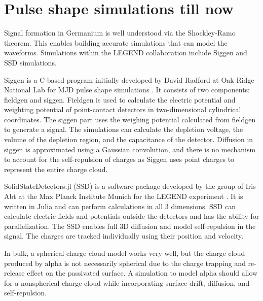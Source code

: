 \section{Pulse shape simulations till now}

Signal formation in Germanium is well understood via the Shockley-Ramo theorem. This enables building accurate simulations that can model the waveforms. Simulations within the LEGEND collaboration include Siggen and SSD simulations. 

Siggen is a C-based program initially developed by David Radford at Oak Ridge National Lab for MJD pulse shape simulations \cite{siggen_paper}. It consists of two components: fieldgen and siggen. Fieldgen is used to calculate the electric potential and weighting potential of point-contact detectors in two-dimensional cylindrical coordinates. The siggen part uses the weighing potential calculated from fieldgen to generate a signal. The simulations can calculate the depletion voltage, the volume of the depletion region, and the capacitance of the detector. Diffusion in siggen is approximated using a Gaussian convolution, and there is no mechanism to account for the self-repulsion of charges as Siggen uses point charges to represent the entire charge cloud.



SolidStateDetectors.jl (SSD) is a software package developed by the group of Iris Abt at the Max Planck Institute Munich for the LEGEND experiment \cite{Abt:2021SSD}. It is written in Julia and can perform calculations in all 3 dimensions. SSD can calculate electric fields and potentials outside the detectors and has the ability for parallelization. The SSD enables full 3D diffusion and model self-repulsion in the signal. The charges are tracked individually using their position and velocity.

In bulk, a spherical charge cloud model works very well, but the charge cloud produced by alpha is not necessarily spherical due to the charge trapping and re-release effect on the passivated surface. A simulation to model alpha should allow for a nonspherical charge cloud while incorporating surface drift, diffusion, and self-repulsion.

